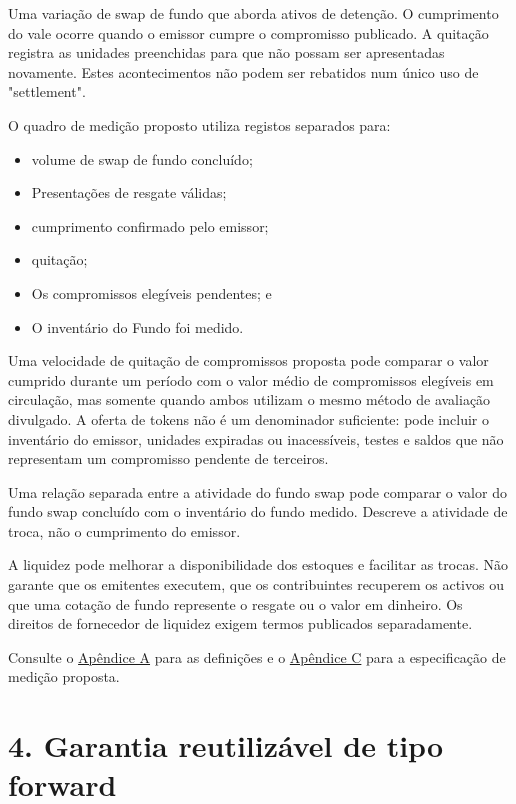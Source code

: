 \documentclass[11pt]{article}
\begin{document}
Uma variação de swap de fundo que aborda ativos de detenção. O cumprimento do vale ocorre quando o emissor cumpre o compromisso publicado. A quitação registra as unidades preenchidas para que não possam ser apresentadas novamente. Estes acontecimentos não podem ser rebatidos num único uso de "settlement".

O quadro de medição proposto utiliza registos separados para:

\begin{itemize}[leftmargin=*]
\item volume de swap de fundo concluído;
\item Presentações de resgate válidas;
\item cumprimento confirmado pelo emissor;
\item quitação;
\item Os compromissos elegíveis pendentes; e
\item O inventário do Fundo foi medido.
\end{itemize}
Uma velocidade de quitação de compromissos proposta pode comparar o valor cumprido durante um período com o valor médio de compromissos elegíveis em circulação, mas somente quando ambos utilizam o mesmo método de avaliação divulgado. A oferta de tokens não é um denominador suficiente: pode incluir o inventário do emissor, unidades expiradas ou inacessíveis, testes e saldos que não representam um compromisso pendente de terceiros.

Uma relação separada entre a atividade do fundo swap pode comparar o valor do fundo swap concluído com o inventário do fundo medido. Descreve a atividade de troca, não o cumprimento do emissor.

A liquidez pode melhorar a disponibilidade dos estoques e facilitar as trocas. Não garante que os emitentes executem, que os contribuintes recuperem os activos ou que uma cotação de fundo represente o resgate ou o valor em dinheiro. Os direitos de fornecedor de liquidez exigem termos publicados separadamente.

Consulte o \href{https://docs.cosmolocal.credit/pt/white-paper/appendix-a-math-box}{Apêndice A} para as definições e o \href{https://docs.cosmolocal.credit/pt/white-paper/appendix-c-kpi-definitions}{Apêndice C} para a especificação de medição proposta.


\section*{4. Garantia reutilizável de tipo forward}
\end{document}
